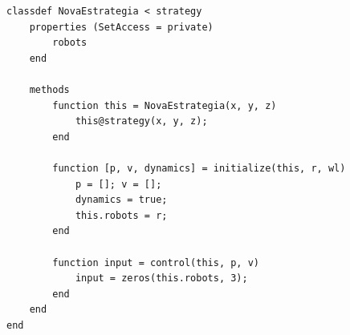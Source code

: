 \documentclass[11pt,a4paper]{article}
\begin{document}
\begin{lstlisting}
classdef NovaEstrategia < strategy
    properties (SetAccess = private)
        robots
    end
    
    methods
        function this = NovaEstrategia(x, y, z)
            this@strategy(x, y, z);
        end
        
        function [p, v, dynamics] = initialize(this, r, wl)
            p = []; v = []; 
            dynamics = true; 
            this.robots = r;
        end
        
        function input = control(this, p, v)
            input = zeros(this.robots, 3);
        end
    end
end
\end{lstlisting}
\end{document}
